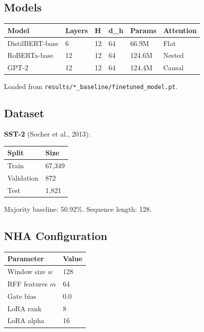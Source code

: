 \subsection{Models}

\begin{table}[H]
\centering
\small
\begin{tabular}{llllll}
\toprule
\textbf{Model} & \textbf{Layers} & \textbf{H} & \textbf{d\_h} & \textbf{Params} & \textbf{Attention} \\
\midrule
DistilBERT-base & 6 & 12 & 64 & 66.9M & Flat \\
RoBERTa-base & 12 & 12 & 64 & 124.6M & Nested \\
GPT-2 & 12 & 12 & 64 & 124.4M & Causal \\
\bottomrule
\end{tabular}
\end{table}

Loaded from \texttt{results/*\_baseline/finetuned\_model.pt}.

\subsection{Dataset}

\textbf{SST-2} (Socher et al., 2013):

\begin{table}[H]
\centering
\small
\begin{tabular}{ll}
\toprule
\textbf{Split} & \textbf{Size} \\
\midrule
Train & 67,349 \\
Validation & 872 \\
Test & 1,821 \\
\bottomrule
\end{tabular}
\end{table}

Majority baseline: 50.92\%. Sequence length: 128.

\subsection{NHA Configuration}

\begin{table}[H]
\centering
\small
\begin{tabular}{ll}
\toprule
\textbf{Parameter} & \textbf{Value} \\
\midrule
Window size $w$ & 128 \\
RFF features $m$ & 64 \\
Gate bias & 0.0 \\
LoRA rank & 8 \\
LoRA alpha & 16 \\
\bottomrule
\end{tabular}
\end{table}

